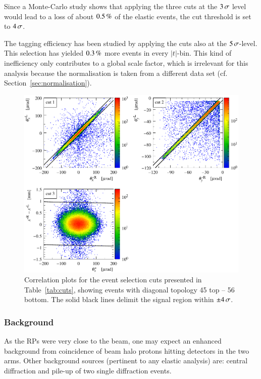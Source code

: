 Since a Monte-Carlo study shows that applying the three cuts at the $3\,{\rm \sigma}$ level would lead to a loss of about $0.5\,{\rm \%}$ of the elastic events, the cut threshold is set to $4\,{\rm \sigma}$.

The tagging efficiency has been studied by applying the cuts also at the $5\,{\rm \sigma}$-level. This selection has yielded $0.3\,{\rm \%}$ more events in every $|t|$-bin. This kind of inefficiency only contributes to a global scale factor, which is irrelevant for this analysis because the normalisation is taken from a different data set (cf. Section~\ref{sec:normalisation}).


\begin{figure}
\begin{center}
\includegraphics{fig/cuts.pdf}
\caption{%
Correlation plots for the event selection cuts presented in Table~\ref{tab:cuts}, showing events with diagonal topology 45 top -- 56 bottom. The solid black lines delimit the signal region within $\pm 4\,{\rm \sigma}$.
}
\label{fig:cuts}
\end{center}
\end{figure}



\subsubsection{Background}
\label{sec:background}

As the RPs were very close to the beam, one may expect an enhanced background from coincidence of beam halo protons hitting detectors in the two arms. Other background sources (pertinent to any elastic analysis) are: central diffraction and pile-up of two single diffraction events.

